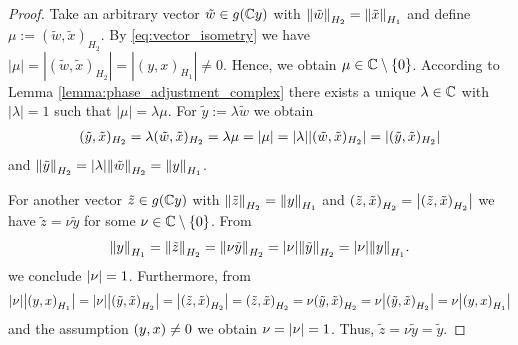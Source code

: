 \begin{proof}
	Take an arbitrary vector $\tilde{w} \in g(\C y)$ with $\norm[H_2]{\tilde{w}} = \norm[H_1]{\tilde{x}}$ and define $\mu := (\tilde{w}, \tilde{x})_{H_2}$. By \eqref{eq:vector_isometry} we have $|\mu| = |(\tilde{w},\tilde{x})_{H_2}| = |(y,x)_{H_1}| \neq 0$. Hence, we obtain $\mu \in \C \setminus \{0\}$. According to Lemma \ref{lemma:phase_adjustment_complex} there exists a unique $\lambda \in \C$ with $|\lambda| = 1$ such that $|\mu| = \lambda \mu$. For $\tilde{y} := \lambda \tilde{w}$ we obtain
	\begin{align*}
		(\tilde{y}, \tilde{x})_{H_2} = \lambda (\tilde{w}, \tilde{x})_{H_2} = \lambda \mu = |\mu| = \vbraces{\lambda}|(\tilde{w}, \tilde{x})_{H_2}| = |(\tilde{y},\tilde{x})_{H_2}|
	\end{align*}
	and $\norm[H_2]{\tilde{y}} = |\lambda| \norm[H_2]{\tilde{w}} = \norm[H_1]{y}$.
	
	For another vector $\tilde{z} \in g\pbraces{\C y}$ with $\norm[H_2]{\tilde{z}} = \norm[H_1]{y}$ and $\pbraces{\tilde{z}, \tilde{x}}_{H_2} = \vbraces{\pbraces{\tilde{z}, \tilde{x}}_{H_2}}$ we have $\tilde{z} = \nu \tilde{y}$ for some $\nu \in \C \setminus \{0\}$. From 
	\begin{align*}
		\norm[H_1]{y} = \norm[H_2]{\tilde{z}} = \norm[H_2]{\nu \tilde{y}} = \vbraces{\nu} \norm[H_2]{\tilde{y}} = \vbraces{\nu} \norm[H_1]{y}.
	\end{align*}
	we conclude $\vbraces{\nu} = 1$. Furthermore, from 
	\begin{align*}
		\vbraces{\nu} \vbraces{\pbraces{y,x}_{H_1}} = \vbraces{\nu} \vbraces{\pbraces{\tilde{y}, \tilde{x}}_{H_2}} = \vbraces{\pbraces{\tilde{z}, \tilde{x}}_{H_2}} = \pbraces{\tilde{z}, \tilde{x}}_{H_2} = \nu \pbraces{\tilde{y}, \tilde{x}}_{H_2} = \nu \vbraces{\pbraces{\tilde{y}, \tilde{x}}_{H_2}} = \nu \vbraces{\pbraces{y, x}_{H_1}}
	\end{align*}
	and the assumption $\pbraces{y,x} \neq 0$ we obtain $\nu = \vbraces{\nu} = 1$. Thus, $\tilde{z} = \nu \tilde{y} = \tilde{y}$. 
\end{proof}


